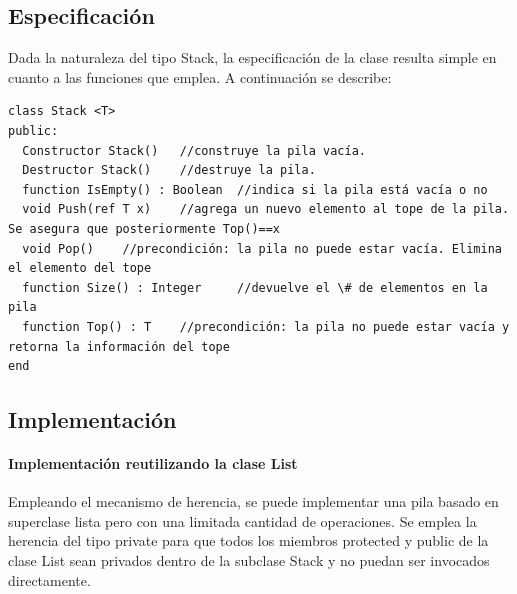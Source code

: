\subsection{Especificación}

Dada la naturaleza del tipo Stack, la especificación de la clase resulta simple en cuanto a las funciones que emplea. A continuación se describe:

\begin{lstlisting}[upquote=true, language=pseudo]
class Stack <T>
public:
  Constructor Stack()	//construye la pila vacía.
  Destructor Stack()	//destruye la pila.
  function IsEmpty() : Boolean	//indica si la pila está vacía o no
  void Push(ref T x)	//agrega un nuevo elemento al tope de la pila. Se asegura que posteriormente Top()==x
  void Pop()	//precondición: la pila no puede estar vacía. Elimina el elemento del tope
  function Size() : Integer		//devuelve el \# de elementos en la pila
  function Top() : T	//precondición: la pila no puede estar vacía y retorna la información del tope
end
\end{lstlisting}

\subsection{Implementación}

\paragraph{Implementación reutilizando la clase List}

Empleando el mecanismo de herencia, se puede implementar una pila basado en superclase lista pero con una
 limitada cantidad de operaciones. Se emplea la herencia del tipo private para que todos los miembros
 protected y public de la clase List sean privados dentro de la subclase Stack y no puedan ser invocados directamente. 

